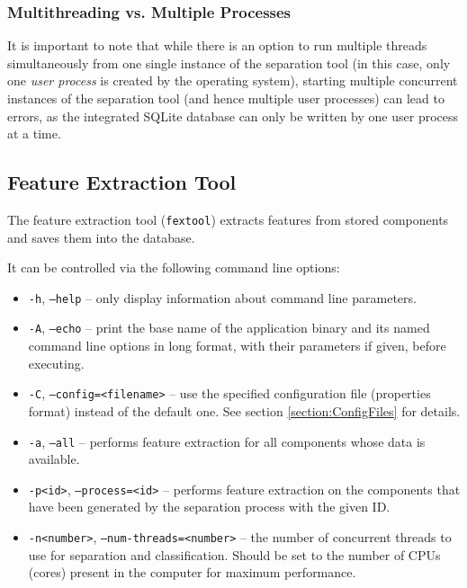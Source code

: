 \subsubsection{Multithreading vs. Multiple Processes}
\label{section:MultithreadingMultiprocessing}

\begin{leftbar}
  It is important to note that while there is an option to run multiple threads
  simultaneously from one single instance of the separation tool (in this case,
  only one \emph{user process} is created by the operating system), starting
  multiple concurrent instances of the separation tool (and hence multiple user
  processes) can lead to errors, as the integrated SQLite database can
  only be written by one user process at a time.
\end{leftbar}


\subsection{Feature Extraction Tool}
\label{section:fextool}

The feature extraction tool (\verb!fextool!) extracts features from stored
components and saves them into the database.

\noindent It can be controlled via the following command line options:
\begin{itemize}
  \item {\tt -h}, {\tt --help} -- only display information about command line
    parameters.
  \item {\tt -A}, {\tt --echo} -- print the base name of the application binary
    and its named command line options in long format, with their parameters if 
    given, before executing.
  \item {\tt -C}, {\tt --config=<filename>} -- use the specified configuration
    file (properties format) instead of the default one. See section 
    \ref{section:ConfigFiles} for details.
  \item {\tt -a}, {\tt --all} -- performs feature extraction for all
    components whose data is available.
  \item {\tt -p<id>}, {\tt --process=<id>} -- performs feature extraction on
    the components that have been generated by the separation process with the
    given ID.
  \item {\tt -n<number>}, {\tt --num-threads=<number>} -- the number of
    concurrent threads to use for separation and classification. Should be set
    to the number of CPUs (cores) present in the computer for maximum
    performance.
\end{itemize}

